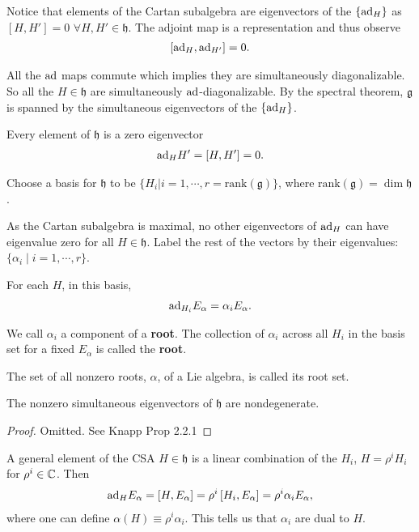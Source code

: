 
Notice that elements of the Cartan subalgebra are eigenvectors of the $\{\text{ad}_H\} $ as $\left[ H, H' \right] = 0$ $\forall H, H' \in \mathfrak{h}$. The adjoint map is a representation and thus observe
\begin{align}
    \left[ \text{ad}_H, \text{ad}_{H'} \right] = 0
.\end{align}

All the $\text{ad}$ maps commute which implies they are simultaneously diagonalizable. So all the $H \in \mathfrak{h}$ are simultaneously $\text{ad}$-diagonalizable. By the spectral theorem, $\mathfrak{g}$ is spanned by the simultaneous eigenvectors of the $\{\text{ad}_H\}$.

Every element of $\mathfrak{h}$ is a zero eigenvector
\begin{align}
    \text{ad}_H H' = \left[ H, H' \right] = 0
.\end{align}

Choose a basis for $\mathfrak{h}$ to be $\{H_{i} | i=1,\cdots,r=\text{rank}\left( \mathfrak{g} \right) \} $, where $\text{rank}\left( \mathfrak{g} \right) = \dim \mathfrak{h}$.

As the Cartan subalgebra is maximal, no other eigenvectors of $\text{ad}_H$ can have eigenvalue zero for all $H \in \mathfrak{h}$. Label the rest of the vectors by their eigenvalues: $\{\alpha_i  \mid i = 1 , \cdots, r \} $.

For each $H$, in this basis,
\begin{align}
    \text{ad}_{H_{i}} E_\alpha = \alpha_i E_\alpha
.\end{align}

We call $\alpha_i$ a component of a \textbf{root}. The collection of $\alpha_i$ across all $H_i$ in the basis set for a fixed $E_\alpha$ is called the \textbf{root}.

\begin{definition}
    The set of all nonzero roots, $\alpha$, of a Lie algebra, is called its root set.
\end{definition}

\begin{proposition}
    The nonzero simultaneous eigenvectors of $\mathfrak{h}$ are nondegenerate.
\end{proposition}

\begin{proof}
    Omitted. See Knapp Prop 2.2.1
\end{proof}

A general element of the CSA $H \in \mathfrak{h}$ is a linear combination of the $H_{i}$, $H = \rho^{i} H_{i}$ for $\rho^{i} \in \mathbb{C}$. Then
\begin{align}
    \text{ad}_H E_\alpha = \left[ H, E_\alpha \right] = \rho^{i} \left[ H_i, E_\alpha \right] = \rho^{i} \alpha_i E_\alpha
,\end{align}
where one can define $\alpha \left( H \right) \equiv \rho^{i} \alpha_i$. This tells us that $\alpha_i$ are dual to $H$.

